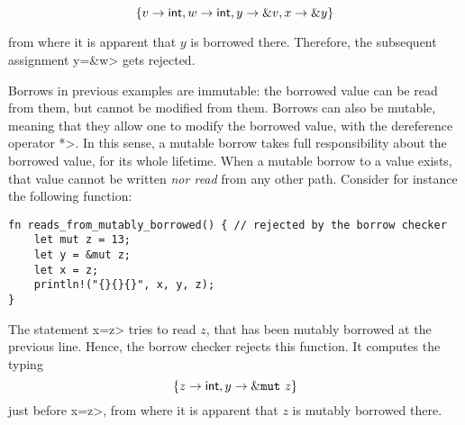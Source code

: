 \[
\{v\to\mathsf{int},w\to\mathsf{int},y\to\& v,x\to\& y\}
\]

\noindent
from where it is apparent that $y$ is borrowed there. Therefore,
the subsequent assignment \<y=\&w> gets rejected.

Borrows in previous examples are immutable: the borrowed value can be read
from them, but cannot be modified from them.
Borrows can also be mutable, meaning that they allow one to modify the
borrowed value, with the dereference operator \<*>. In this sense,
a mutable borrow takes full responsibility about the borrowed value, for its
whole lifetime. When a mutable borrow to a value exists, that value cannot
be written \emph{nor read} from any other path. Consider for instance
the following function:

\begin{lstlisting}
fn reads_from_mutably_borrowed() { // rejected by the borrow checker
    let mut z = 13;
    let y = &mut z;
    let x = z;
    println!("{}{}{}", x, y, z);
}
\end{lstlisting}

\noindent
The statement \<x=z> tries to read $z$, that has been mutably borrowed
at the previous line. Hence, the borrow checker rejects this function.
It computes the typing
\[
\{z\to\mathsf{int},y\to\&\mathtt{mut}\  z\}
\]
just before \<x=z>, from where it is apparent that $z$ is mutably borrowed there.

%
%

%
%
